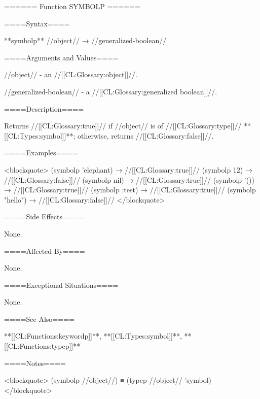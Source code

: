====== Function SYMBOLP ======

====Syntax====

**symbolp** //object// → //generalized-boolean//

====Arguments and Values====

//object// - an //[[CL:Glossary:object]]//.

//generalized-boolean// - a //[[CL:Glossary:generalized boolean]]//.

====Description====

Returns //[[CL:Glossary:true]]// if //object// is of //[[CL:Glossary:type]]// **[[CL:Types:symbol]]**; otherwise, returns //[[CL:Glossary:false]]//.

====Examples====

<blockquote> (symbolp 'elephant) → //[[CL:Glossary:true]]// (symbolp 12) → //[[CL:Glossary:false]]// (symbolp nil) → //[[CL:Glossary:true]]// (symbolp '()) → //[[CL:Glossary:true]]// (symbolp :test) → //[[CL:Glossary:true]]// (symbolp "hello") → //[[CL:Glossary:false]]// </blockquote>

====Side Effects====

None.

====Affected By====

None.

====Exceptional Situations====

None.

====See Also====

**[[CL:Functions:keywordp]]**, **[[CL:Types:symbol]]**, **[[CL:Functions:typep]]**

====Notes====

<blockquote> (symbolp //object//) ≡ (typep //object// 'symbol) </blockquote>

